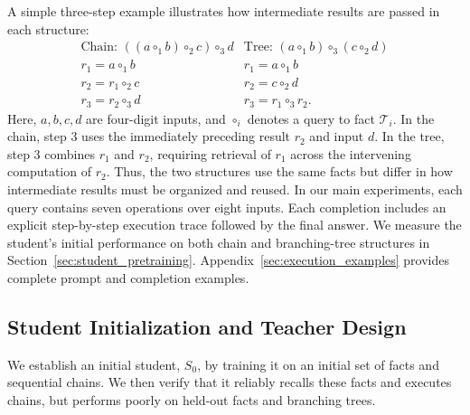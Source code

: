 \documentclass[]{template}
\theoremstyle{plain}
\theoremstyle{definition}
\theoremstyle{remark}
\renewcommand{\paragraph}[1]{\vspace{1mm}\noindent\textbf{#1}}
\begin{document}
A simple three-step example illustrates how intermediate results are passed in each structure:
\[
\begin{array}{ll}
\text{Chain: }((a\circ_1 b)\circ_2 c)\circ_3 d
& \text{Tree: }(a\circ_1 b)\circ_3(c\circ_2 d) \\[3pt]
r_1=a\circ_1 b & r_1=a\circ_1 b \\
r_2=r_1\circ_2 c & r_2=c\circ_2 d \\
r_3=r_2\circ_3 d & r_3=r_1\circ_3 r_2.
\end{array}
\]
Here, $a, b, c, d$ are four-digit inputs, and $\circ_i$ denotes a query to fact $\mathcal{T}_i$. In the chain, step 3 uses the immediately preceding result $r_2$ and input $d$. In the tree, step 3 combines $r_1$ and $r_2$, requiring retrieval of $r_1$ across the intervening computation of $r_2$. 
Thus, the two structures use the same facts but differ in how intermediate results must be organized and reused. In our main experiments, each query contains seven operations over eight inputs. Each completion includes an explicit step-by-step execution trace followed by the final answer. We measure the student's initial performance on both chain and branching-tree structures in Section~\ref{sec:student_pretraining}. Appendix~\ref{sec:execution_examples} provides complete prompt and completion examples.





\subsection{Student Initialization and Teacher Design}
We establish an initial student, \(S_0\), by training it on an initial set of facts and sequential chains.  We then verify that it reliably recalls these facts and executes chains, but performs poorly on held-out facts and branching trees.
\end{document}
